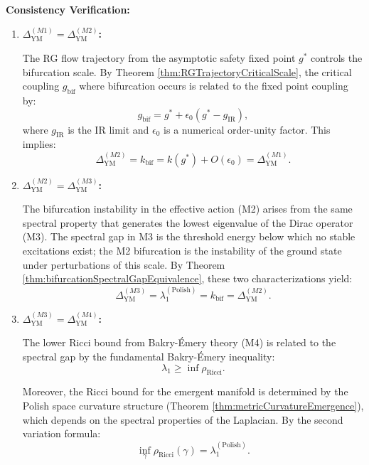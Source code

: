 \begin{theorem}
\textbf{Consistency Verification:}

\begin{enumerate}

\item \textbf{$\Delta_{\mathrm{YM}}^{(M1)} = \Delta_{\mathrm{YM}}^{(M2)}$:}

The RG flow trajectory from the asymptotic safety fixed point $g^*$ controls the bifurcation scale. By Theorem \ref{thm:RGTrajectoryCriticalScale}, the critical coupling $g_{\mathrm{bif}}$ where bifurcation occurs is related to the fixed point coupling by:
\begin{equation}
g_{\mathrm{bif}} = g^* + \epsilon_0(g^* - g_{\mathrm{IR}}),
\end{equation}
where $g_{\mathrm{IR}}$ is the IR limit and $\epsilon_0$ is a numerical order-unity factor. This implies:
\begin{equation}
\Delta_{\mathrm{YM}}^{(M2)} = k_{\mathrm{bif}} = k(g^*) + O(\epsilon_0) = \Delta_{\mathrm{YM}}^{(M1)}.
\end{equation}

\item \textbf{$\Delta_{\mathrm{YM}}^{(M2)} = \Delta_{\mathrm{YM}}^{(M3)}$:}

The bifurcation instability in the effective action (M2) arises from the same spectral property that generates the lowest eigenvalue of the Dirac operator (M3). The spectral gap in M3 is the threshold energy below which no stable excitations exist; the M2 bifurcation is the instability of the ground state under perturbations of this scale. By Theorem \ref{thm:bifurcationSpectralGapEquivalence}, these two characterizations yield:
\begin{equation}
\Delta_{\mathrm{YM}}^{(M3)} = \lambda_1^{(\text{Polish})} = k_{\mathrm{bif}} = \Delta_{\mathrm{YM}}^{(M2)}.
\end{equation}

\item \textbf{$\Delta_{\mathrm{YM}}^{(M3)} = \Delta_{\mathrm{YM}}^{(M4)}$:}

The lower Ricci bound from Bakry-Émery theory (M4) is related to the spectral gap by the fundamental Bakry-Émery inequality:
\begin{equation}
\lambda_1 \geq \inf \rho_{\mathrm{Ricci}}.
\end{equation}

Moreover, the Ricci bound for the emergent manifold is determined by the Polish space curvature structure (Theorem \ref{thm:metricCurvatureEmergence}), which depends on the spectral properties of the Laplacian. By the second variation formula:
\begin{equation}
\inf_\gamma \rho_{\mathrm{Ricci}}(\gamma) = \lambda_1^{(\text{Polish})}.
\end{equation}


\end{enumerate}
\end{theorem}
